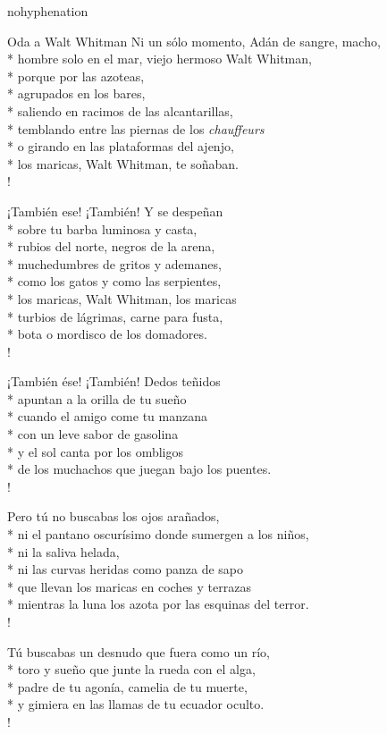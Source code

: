 \documentclass[
    a5paper,
    DIV=10,
    12pt,
    notitlepage,
    oneside,]
{scrbook} %
\begin{document}
\begin{hyphenrules}{nohyphenation}
\begin{poem}{Oda a Walt Whitman}{}{\vspace{-1em}}
Ni un sólo momento, Adán de sangre, macho,\\*
hombre solo en el mar, viejo hermoso Walt Whitman,\\*
porque por las azoteas,\\*
agrupados en los bares,\\*
saliendo en racimos de las alcantarillas,\\*
temblando entre las piernas de los \emph{chauffeurs}\\*
o girando en las plataformas del ajenjo,\\*
los maricas, Walt Whitman, te soñaban.\\!

¡También ese! ¡También! Y se despeñan\\*
sobre tu barba luminosa y casta,\\*
rubios del norte, negros de la arena,\\*
muchedumbres de gritos y ademanes,\\*
como los gatos y como las serpientes,\\*
los maricas, Walt Whitman, los maricas\\*
turbios de lágrimas, carne para fusta,\\*
bota o mordisco de los domadores.\\!

¡También ése! ¡También! Dedos teñidos\\*
apuntan a la orilla de tu sueño\\*
cuando el amigo come tu manzana\\*
con un leve sabor de gasolina\\*
y el sol canta por los ombligos\\*
de los muchachos que juegan bajo los puentes.\\!

Pero tú no buscabas los ojos arañados,\\*
ni el pantano oscurísimo donde sumergen a los niños,\\*
ni la saliva helada,\\*
ni las curvas heridas como panza de sapo\\*
que llevan los maricas en coches y terrazas\\*
mientras la luna los azota por las esquinas del terror.\\!

Tú buscabas un desnudo que fuera como un río,\\*
toro y sueño que junte la rueda con el alga,\\*
padre de tu agonía, camelia de tu muerte,\\*
y gimiera en las llamas de tu ecuador oculto.\\!


\end{poem}
\end{hyphenrules}
\end{document}
